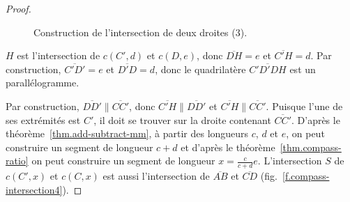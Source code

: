 \begin{proof}
\begin{figure}[htbp]

\caption{Construction de l'intersection de deux droites (3).}\label{f.compass-intersection3}
\end{figure}

$H$ est l'intersection de $c(C',d)$ et $c(D,e)$, donc $\overline{DH}=e$ et  $\overline{C'H}=d$. Par construction,  $\overline{C'D'} = e$ et $\overline{D'D}=d$,  donc le quadrilatère $\overline{C'D'DH}$ est un parallélogramme. 

Par construction,  $\overline{DD'}\parallel\overline{CC'}$, donc  $\overline{C'H}\parallel \overline{DD'}$ et $\overline{C'H}\parallel\overline{CC'}$. Puisque l'une de ses extrémités est $C'$, il doit se trouver sur la droite contenant $\overline{CC'}$. D'après le théorème~\ref{thm.add-subtract-mm}, à partir des longueurs $c$, $d$ et $e$, on peut construire un segment  de longueur $c+d$ et d'après le théorème~\ref{thm.compass-ratio} on peut construire un segment  de longueur $x=\displaystyle\frac{c}{c+d}e$. L'intersection $S$ de $c(C',x)$ et $c(C,x)$ est aussi l'intersection de $\overline{AB}$ et $\overline{CD}$ (fig.~\ref{f.compass-intersection4}).
\end{proof}

